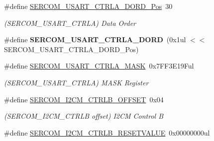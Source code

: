 \begin{DoxyCompactItemize}
\item 
\hypertarget{group___s_a_m_l21___s_e_r_c_o_m_ga1c8e88a80e5fce6e94d3a9b34b036415}{}\#define \hyperlink{group___s_a_m_l21___s_e_r_c_o_m_ga1c8e88a80e5fce6e94d3a9b34b036415}{S\+E\+R\+C\+O\+M\+\_\+\+U\+S\+A\+R\+T\+\_\+\+C\+T\+R\+L\+A\+\_\+\+D\+O\+R\+D\+\_\+\+Pos}~30\label{group___s_a_m_l21___s_e_r_c_o_m_ga1c8e88a80e5fce6e94d3a9b34b036415}

\begin{DoxyCompactList}\small\item\em (S\+E\+R\+C\+O\+M\+\_\+\+U\+S\+A\+R\+T\+\_\+\+C\+T\+R\+L\+A) Data Order \end{DoxyCompactList}\item 
\hypertarget{group___s_a_m_l21___s_e_r_c_o_m_ga820b6013f99ee8251740107f717f0d2c}{}\#define {\bfseries S\+E\+R\+C\+O\+M\+\_\+\+U\+S\+A\+R\+T\+\_\+\+C\+T\+R\+L\+A\+\_\+\+D\+O\+R\+D}~(0x1ul $<$$<$ S\+E\+R\+C\+O\+M\+\_\+\+U\+S\+A\+R\+T\+\_\+\+C\+T\+R\+L\+A\+\_\+\+D\+O\+R\+D\+\_\+\+Pos)\label{group___s_a_m_l21___s_e_r_c_o_m_ga820b6013f99ee8251740107f717f0d2c}

\item 
\hypertarget{group___s_a_m_l21___s_e_r_c_o_m_ga73e6a33cf92a67b5d943f7465b0a9f89}{}\#define \hyperlink{group___s_a_m_l21___s_e_r_c_o_m_ga73e6a33cf92a67b5d943f7465b0a9f89}{S\+E\+R\+C\+O\+M\+\_\+\+U\+S\+A\+R\+T\+\_\+\+C\+T\+R\+L\+A\+\_\+\+M\+A\+S\+K}~0x7\+F\+F3\+E19\+Ful\label{group___s_a_m_l21___s_e_r_c_o_m_ga73e6a33cf92a67b5d943f7465b0a9f89}

\begin{DoxyCompactList}\small\item\em (S\+E\+R\+C\+O\+M\+\_\+\+U\+S\+A\+R\+T\+\_\+\+C\+T\+R\+L\+A) M\+A\+S\+K Register \end{DoxyCompactList}\item 
\hypertarget{group___s_a_m_l21___s_e_r_c_o_m_gaf43c99450b5d3433ad21ebe9b4ea7e12}{}\#define \hyperlink{group___s_a_m_l21___s_e_r_c_o_m_gaf43c99450b5d3433ad21ebe9b4ea7e12}{S\+E\+R\+C\+O\+M\+\_\+\+I2\+C\+M\+\_\+\+C\+T\+R\+L\+B\+\_\+\+O\+F\+F\+S\+E\+T}~0x04\label{group___s_a_m_l21___s_e_r_c_o_m_gaf43c99450b5d3433ad21ebe9b4ea7e12}

\begin{DoxyCompactList}\small\item\em (S\+E\+R\+C\+O\+M\+\_\+\+I2\+C\+M\+\_\+\+C\+T\+R\+L\+B offset) I2\+C\+M Control B \end{DoxyCompactList}\item 
\hypertarget{group___s_a_m_l21___s_e_r_c_o_m_ga8a10ef54f804aec64558615523d6a763}{}\#define \hyperlink{group___s_a_m_l21___s_e_r_c_o_m_ga8a10ef54f804aec64558615523d6a763}{S\+E\+R\+C\+O\+M\+\_\+\+I2\+C\+M\+\_\+\+C\+T\+R\+L\+B\+\_\+\+R\+E\+S\+E\+T\+V\+A\+L\+U\+E}~0x00000000ul\label{group___s_a_m_l21___s_e_r_c_o_m_ga8a10ef54f804aec64558615523d6a763}


\end{DoxyCompactItemize}
